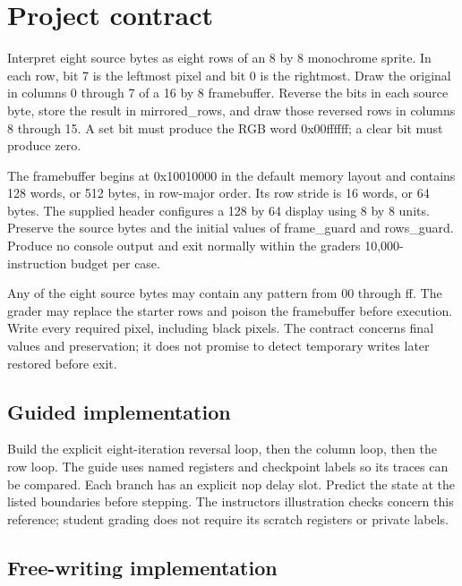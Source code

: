 \section{Project contract}\label{003-eight-byte-sprite-assignment-draw-an-eight-byte-sprite-and-its-mirror}

Interpret eight source bytes as eight rows of an 8 by 8 monochrome
sprite. In each row, bit 7 is the leftmost pixel and bit 0 is the
rightmost. Draw the original in columns 0 through 7 of a 16 by 8
framebuffer. Reverse the bits in each source byte, store the result in
mirrored\_rows, and draw those reversed rows in columns 8 through 15. A
set bit must produce the RGB word 0x00ffffff; a clear bit must produce
zero.

The framebuffer begins at 0x10010000 in the default memory layout and
contains 128 words, or 512 bytes, in row-major order. Its row stride is
16 words, or 64 bytes. The supplied header configures a 128 by 64
display using 8 by 8 units. Preserve the source bytes and the initial
values of frame\_guard and rows\_guard. Produce no console output and
exit normally within the grader\textquotesingle s 10,000-instruction
budget per case.

Any of the eight source bytes may contain any pattern from 00 through
ff. The grader may replace the starter rows and poison the framebuffer
before execution. Write every required pixel, including black pixels.
The contract concerns final values and preservation; it does not promise
to detect temporary writes later restored before exit.

\subsection{Guided
  implementation}\label{003-eight-byte-sprite-assignment-guided-implementation}

Build the explicit eight-iteration reversal loop, then the column loop,
then the row loop. The guide uses named registers and checkpoint labels
so its traces can be compared. Each branch has an explicit nop delay
slot. Predict the state at the listed boundaries before stepping. The
instructor\textquotesingle s illustration checks concern this reference;
student grading does not require its scratch registers or private
labels.

\subsection{Free-writing
  implementation}\label{003-eight-byte-sprite-assignment-free-writing-implementation}

